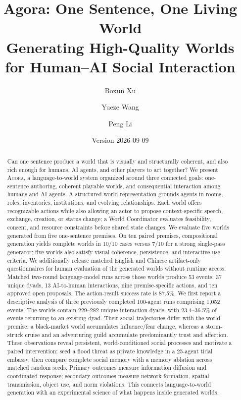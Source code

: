 \documentclass[10pt,twocolumn]{article}
\title{\textbf{Agora: One Sentence, One Living World}\\
Generating High-Quality Worlds for Human--AI Social Interaction}
\author{Boxun Xu \and Yueze Wang \and Peng Li}
\date{Version 2026-09-09}
\newcommand{\agora}{\textsc{Agora}\xspace}
\begin{document}
\maketitle

\begin{abstract}
Can one sentence produce a world that is visually and structurally coherent,
and also rich enough for humans, AI agents, and other players to act together?
We present \agora, a language-to-world system organized around three connected
goals: one-sentence authoring, coherent playable worlds, and consequential
interaction among humans and AI agents. A structured world representation
grounds agents in rooms, roles, inventories, institutions, and evolving
relationships. Each world offers recognizable actions while also allowing an
actor to propose context-specific speech, exchange, creation, or status change;
a World Coordinator evaluates feasibility, consent, and resource constraints
before shared state changes. We evaluate five worlds generated from five
one-sentence premises. On ten paired premises, compositional generation yields
complete worlds in 10/10 cases versus 7/10 for a strong single-pass generator;
five worlds also satisfy visual coherence, persistence, and interactive-use
criteria. We additionally release matched English and Chinese artifact-only
questionnaires for human evaluation of the generated worlds without runtime
access. Matched two-round language-model runs across those worlds produce 53
events: 37 unique dyads, 13 AI-to-human interactions, nine premise-specific
actions, and ten approved open proposals. The action-result
success rate is 87.5\%.
We first report a descriptive analysis of three previously completed 100-agent
runs comprising 1,052 events. The worlds contain 229--282 unique
interaction dyads, with 23.4--36.5\% of events returning to an existing dyad.
Their social trajectories differ with the
world premise: a black-market world accumulates influence/fear change, whereas
a storm-struck cruise and an adventuring guild accumulate predominantly trust
and affection. These observations reveal persistent, world-conditioned social
processes and motivate a paired intervention: seed a flood threat as private
knowledge in a 25-agent tidal embassy, then compare complete social memory with
a memory ablation across matched random seeds. Primary outcomes measure
information diffusion and coordinated response; secondary outcomes measure
network formation, spatial transmission, object use, and norm violations.
This connects language-to-world generation with an experimental science of what
happens inside generated worlds.
\end{abstract}
\end{document}
